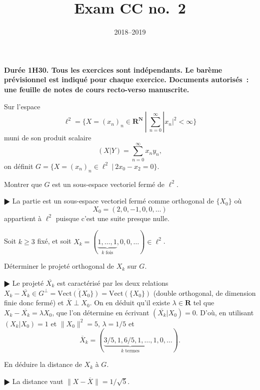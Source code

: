 \documentclass[11pt,a4paper]{article}
\title{Exam CC no.~2}
\date{2018--2019}
\def\N{\mathbf{N}}
\def\R{\mathbf{R}}
\def\Vect{\mathrm{Vect}}
\def\iy{\infty}
\renewcommand{\bar}{\overline}
\theoremstyle{plain}
\theoremstyle{definition}
\begin{document}
\maketitle

\vspace*{-.5cm}
{\bf Dur\'ee 1H30. Tous les exercices sont ind\'ependants.
Le bar\`eme pr\'e\-vi\-sion\-nel est indiqu\'e pour chaque exercice.
Documents autoris\'es~: une feuille de notes de cours recto-verso manuscrite.}

\begin{Exercice}[4 points]
Sur l'espace
\[ \ell^2=\{X=(x_n)_n \in \R^\N\ |\ \sum_{n=0}^\iy |x_n|^2<\iy\} \]
muni de son produit scalaire
\[ (X|Y) = \sum_{n=0}^\iy x_n y_n, \]
on d\'efinit $G = \{X=(x_n)_n \in \ell^2\ |\ 2x_0-x_2= 0\}$.

\begin{Question} Montrer que $G$ est un sous-espace vectoriel ferm\'e de $\ell^2$.
\end{Question}

\begin{corr} $\RHD$ La partie est un sous-espace vectoriel ferm\'e comme orthogonal de $\{X_0\}$ o\`u
\[ X_0=(2,0,-1,0,0,\dots) \]
appartient \`a $\ell^2$ puisque c'est une suite presque nulle.
\end{corr}

Soit $k \geq 3$ fix\'e, et soit
$X_k=(\underbrace{1,\dots,1}_{k \text{ fois}},0,0,\dots) \in \ell^2$.

\begin{Question} D\'eterminer le projet\'e orthogonal de $X_k$ sur $G$. \end{Question}

\begin{corr} $\RHD$
Le projet\'e $\bar{X_k}$ est caract\'eris\'e par les deux relations $X_k-\bar{X_k}
\in G^\perp=\overline{\Vect(\{X_0\})}=\Vect(\{X_0\})$ (double orthogonal,
de dimension finie donc fer\-m\'e) et $\bar{X} \perp X_0$. On en d\'eduit qu'il existe
$\lambda \in \R$ tel que $X_k-\bar{X_k}=\lambda X_0$, que l'on d\'etermine en \'ecrivant
$(\bar{X_k}|X_0)=0$. D'o\`u, en utilisant $(X_k|X_0)=1$ et $\|X_0\|^2=5$,
$\lambda=1/5$ et
\[ \bar{X}_k = (\underbrace{3/5,1,6/5,1,\dots,1}_{k \text{ termes}},0,\dots). \]
\end{corr}

\begin{Question} En d\'eduire la distance de $X_k$ \`a $G$. \end{Question}

\begin{corr} $\RHD$ La distance vaut $\|X-\bar{X}\| = 1/\sqrt{5}$.
\end{corr}

\end{Exercice} \vspace*{1em}
\end{document}
